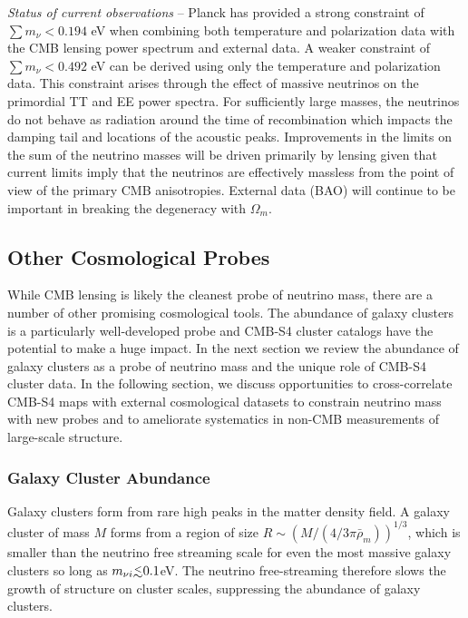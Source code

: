 {\it Status of current observations} -- Planck has provided a strong constraint of $\sum m_\nu < 0.194$ eV when combining both temperature and polarization data with the CMB lensing power spectrum and external data.  A weaker constraint of $\sum m_\nu < 0.492$ eV can be derived using only the temperature and polarization data.  This constraint arises through the effect of massive neutrinos on the primordial TT and EE power spectra.  For sufficiently large masses, the neutrinos do not behave as radiation around the time of recombination which impacts the damping tail and locations of the acoustic peaks.  Improvements in the limits on the sum of the neutrino masses will be driven primarily by lensing given that current limits imply that the neutrinos are effectively massless from the point of view of the primary CMB anisotropies.  External data (BAO) will continue to be important in breaking the degeneracy with $\Omega_m$.  

\subsection{Other Cosmological Probes}

While CMB lensing is likely the cleanest probe of neutrino mass, there are a number of other promising cosmological tools.  The abundance of galaxy clusters is a particularly well-developed probe and CMB-S4 cluster catalogs have the potential to make a huge impact. In the next section we review the abundance of galaxy clusters as a probe of neutrino mass and the unique role of CMB-S4 cluster data. In the following section, we discuss opportunities to cross-correlate CMB-S4 maps with external cosmological datasets to constrain neutrino mass with new probes and to ameliorate systematics in non-CMB measurements of large-scale structure. 


\subsubsection{Galaxy Cluster Abundance}
Galaxy clusters form from rare high peaks in the matter density field. A galaxy cluster of mass $M$ forms from a region of size $R\sim \left(M/(4/3\pi \bar\rho_m)\right)^{1/3}$, which is smaller than the neutrino free streaming scale for even the most massive galaxy clusters so long as $m_{\nu i} \lsim 0.1$eV. The neutrino free-streaming therefore slows the growth of structure on cluster scales, suppressing the abundance of galaxy clusters. 



